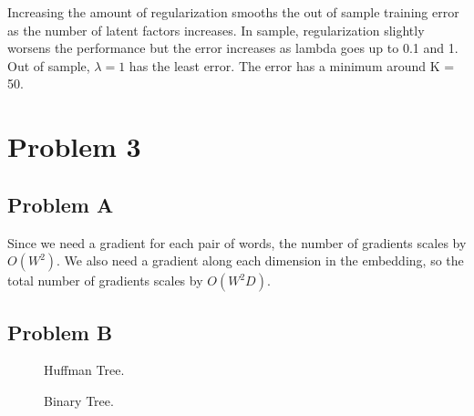 \documentclass[12pt]{article} %
\begin{document}
Increasing the amount of regularization smooths the out of sample training error as the number of latent factors increases. In sample, regularization slightly worsens the performance but the error increases as lambda goes up to 0.1 and 1. Out of sample, $\lambda = 1$ has the least error. The error has a minimum around K = 50.

\section{Problem 3}
\subsection{Problem A}
Since we need a gradient for each pair of words, the number of gradients scales by $O(W^2)$. We also need a gradient along each dimension in the embedding, so the total number of gradients scales by $O(W^2 D)$.

\subsection{Problem B}

\begin{figure}[H]
	\vspace{-10mm}
	\caption{Huffman Tree.}
\end{figure}

\begin{figure}[H]
	\vspace{-10mm}
	\caption{Binary Tree.}
\end{figure}
\end{document}
